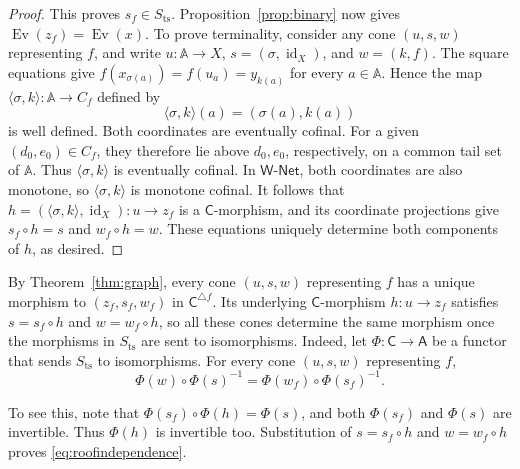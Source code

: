 \documentclass[11pt,a4paper]{article}
\theoremstyle{definition}
\theoremstyle{remark}
\newcommand{\Wpar}{\mathsf{W\text{-}Net}}
\newcommand{\CC}{\mathsf C}
\newcommand{\Ev}{\operatorname{Ev}}
\newcommand{\id}{\operatorname{id}}
\newcommand{\Sts}{S_{\mathrm{ts}}}
\begin{document}
\begin{proof}
This proves \(s_f\in\Sts\). Proposition~\ref{prop:binary} now
gives \(\Ev(z_f)=\Ev(x)\).
To prove terminality, consider any cone \((u,s,w)\) representing
\(f\), and write \(u:\mathbb A\to X\),
\(s=(\sigma,\id_X)\), and \(w=(k,f)\). The square equations
give \(f(x_{\sigma(a)})=f(u_a)=y_{k(a)}\) for every
\(a\in\mathbb A\). Hence the map
\(\langle\sigma,k\rangle:\mathbb A\to C_f\) defined by
\[
 \langle\sigma,k\rangle(a)=(\sigma(a),k(a))
\]
is well defined. Both coordinates are eventually cofinal. For a
given \((d_0,e_0)\in C_f\), they therefore lie above
\(d_0,e_0\), respectively, on a common tail set of \(\mathbb A\).
Thus \(\langle\sigma,k\rangle\) is eventually cofinal. In \(\Wpar\), both
coordinates are also monotone, so \(\langle\sigma,k\rangle\) is monotone cofinal.
It follows that \(h=(\langle\sigma,k\rangle,\id_X):u\to z_f\) is a
\(\CC\)-morphism, and its coordinate projections give
\(s_f\circ h=s\) and \(w_f\circ h=w\). These equations
uniquely determine both components of \(h\), as desired.
\end{proof}

By Theorem~\ref{thm:graph}, every cone \((u,s,w)\) representing \(f\)
has a unique morphism to \((z_f,s_f,w_f)\) in \(\CC^{\triangle f}\).
Its underlying \(\CC\)-morphism \(h:u\to z_f\) satisfies
\(s=s_f\circ h\) and \(w=w_f\circ h\), so all these cones determine
the same morphism once the morphisms in \(\Sts\) are sent to
isomorphisms. Indeed, let \(\Phi:\CC\to\mathsf A\) be a functor that
sends \(\Sts\) to isomorphisms. For every cone \((u,s,w)\)
representing \(f\),
\begin{equation}\label{eq:roofindependence}
 \Phi(w)\circ\Phi(s)^{-1}
       =\Phi(w_f)\circ\Phi(s_f)^{-1}.
\end{equation}

To see this, note that \(\Phi(s_f)\circ\Phi(h)=\Phi(s)\), and both
\(\Phi(s_f)\) and \(\Phi(s)\) are invertible. Thus
\(\Phi(h)\) is invertible too. Substitution of
\(s=s_f\circ h\) and \(w=w_f\circ h\) proves
\eqref{eq:roofindependence}.
\end{document}
